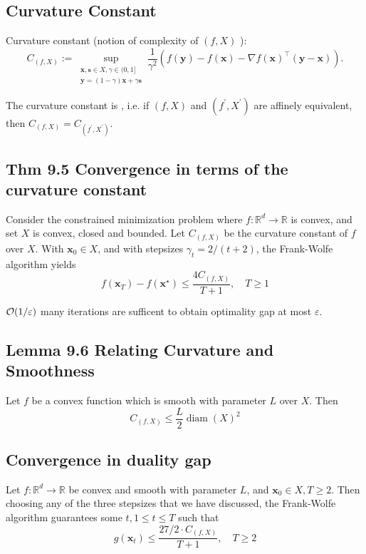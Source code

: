 \subsection*{Curvature Constant}
Curvature constant (notion of complexity of $(f, X)$ ):
$$
C_{(f, X)}:=\sup _{\substack{\mathbf{x}, \mathbf{s} \in X, \gamma \in(0,1] \\ \mathbf{y}=(1-\gamma) \mathbf{x}+\gamma \mathbf{s}}} \frac{1}{\gamma^{2}}\left(f(\mathbf{y})-f(\mathbf{x})-\nabla f(\mathbf{x})^{\top}(\mathbf{y}-\mathbf{x})\right) .
$$

The curvature constant is , i.e. if $(f, X)$ and $\left(f^{\prime}, X^{\prime}\right)$ are affinely equivalent, then $C_{(f, X)}=C_{\left(f^{\prime}, X^{\prime}\right)}$.







\subsection*{Thm 9.5 Convergence in terms of the curvature constant}
Consider the constrained minimization problem where $f: \mathbb{R}^{d} \rightarrow \mathbb{R}$ is convex, and set $X$ is convex, closed and bounded. Let $C_{(f, X)}$ be the curvature constant of $f$ over $X$. With $\mathbf{x}_{0} \in X$, and with stepsizes $\gamma_{t}=2 /(t+2)$, the Frank-Wolfe algorithm yields
$$
f\left(\mathbf{x}_{T}\right)-f\left(\mathbf{x}^{\star}\right) \leq \frac{4 C_{(f, X)}}{T+1}, \quad T \geq 1
$$

$\operatorname{\mathcal{O}}(1 / \varepsilon)$ many iterations are sufficent to obtain optimality gap at most $\varepsilon$.




\subsection*{Lemma 9.6 Relating Curvature and Smoothness}
Let $f$ be a convex function which is smooth with parameter $L$ over $X$. Then
$$
C_{(f, X)} \leq \frac{L}{2} \operatorname{diam}(X)^{2}
$$




\subsection*{Convergence in duality gap}
Let $f: \mathbb{R}^{d} \rightarrow \mathbb{R}$ be convex and smooth with parameter $L$, and $\mathbf{x}_{0} \in X, T \geq 2$. Then choosing any of the three stepsizes that we have discussed, the Frank-Wolfe algorithm guarantees some $t, 1 \leq t \leq T$ such that
$$
g\left(\mathbf{x}_{t}\right) \leq \frac{27 / 2 \cdot C_{(f, X)}}{T+1}, \quad T \geq 2
$$

